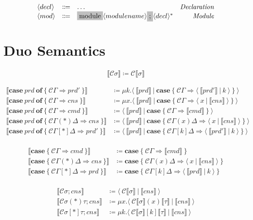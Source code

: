 \documentclass[11pt]{article}
\newcommand{\translate}[1]{\llbracket #1 \rrbracket}
\newcommand{\C}{\mathcal{C}}
\newcommand{\case}[1]{\mathbf{case}\ \{\ #1\ \}}
\newcommand{\caseof}[2]{\mathbf{case}\ #1\ \mathbf{of}\ \{\ #2\ \}}
\newcommand{\pat}[1]{\C\Gamma \Rightarrow #1 }
\newcommand{\prdpat}[2]{\C\Gamma(#1)\Delta \Rightarrow #2 }
\newcommand{\cnspat}[2]{\C\Gamma[#1]\Delta \Rightarrow #2 }
\newcommand{\nonterminal}[1]{\langle #1 \rangle}
\newcommand{\terminal}[1]{\colorbox{lightgray}{\vphantom{X}#1}}
\newcommand{\cut}[2]{\langle\ #1\ |\ #2\ \rangle}
\begin{document}
\[
  \begin{array}{lclr}
    \nonterminal{decl} & \Coloneqq & \ldots  & \emph{Declaration} \\
    \nonterminal{mod} & \Coloneqq & \terminal{module} \nonterminal{modulename} \terminal{;} \nonterminal{decl}^{\ast}& \emph{Module}
  \end{array}
\]

\section{Duo Semantics}

\begin{align*}
  \translate{\C\sigma} \coloneqq \C\translate{\sigma}
\end{align*}

\begin{align*}
  \translate{\caseof{prd}{\pat{prd'}}} &\coloneqq \mu k.\cut{\translate{prd}}{\case{\pat{\cut{\translate{prd'}}{k}}}}\\
  \translate{\caseof{prd}{\pat{cns}}} &\coloneqq \mu x.\cut{\translate{prd}}{\case{\pat{\cut{x}{\translate{cns}}}}}\\
  \translate{\caseof{prd}{\pat{cmd}}} &\coloneqq \cut{\translate{prd}}{\case{\pat{\translate{cmd}}}}\\
  \translate{\caseof{prd}{\prdpat{*}{cns}}} &\coloneqq \cut{\translate{prd}}{\case{\prdpat{x}{\cut{x}{\translate{cns}}}}} \\
  \translate{\caseof{prd}{\cnspat{*}{prd'}}} &\coloneqq \cut{\translate{prd}}{\case{\cnspat{k}{\cut{\translate{prd'}}{k}}}} \\
\end{align*}

\begin{align*}
  \translate{\case{\pat{cmd}}} &\coloneqq \case{\pat{\translate{cmd}}} \\
  \translate{\case{\prdpat{*}{cns}}} &\coloneqq \case{\prdpat{x}{\cut{x}{\translate{cns}}}} \\
  \translate{\case{\cnspat{*}{prd}}} &\coloneqq \case{\cnspat{k}{\cut{\translate{prd}}{k}}} \\
\end{align*}

\begin{align*}
  \translate{\C\sigma;cns} &\coloneqq \cut{\C\translate{\sigma}}{\translate{cns}} \\
  \translate{\C\sigma(*)\tau;cns} &\coloneqq \mu x.\cut{\C\translate{\sigma}(x)\translate{\tau}}{\translate{cns}} \\
  \translate{\C\sigma[*]\tau;cns} &\coloneqq \mu k.\cut{\C\translate{\sigma}[k]\translate{\tau}}{\translate{cns}} \\
\end{align*}
\end{document}
